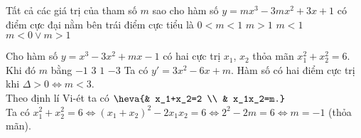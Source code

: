 \begin{ex}%
    Tất cả các giá trị của tham số $m$ sao cho hàm số  $y =  m x^3 - 3 m x^2 +  3 x + 1$  có điểm cực đại nằm bên trái điểm cực tiểu là
    \choice
    {$0 < m < 1$}
    {\True $m > 1$}
    {$  m <1$}
    {$m < 0 \vee m>1 $}
\end{ex}
\begin{ex}%
    Cho hàm số $y=x^3-3x^2+m x-1$ có hai cực trị $x_1$, $x_2$ thỏa mãn $x_1^2+x_2^2=6$. Khi đó $m$ bằng
    \choice
    {\True $-1$}
    {$3$}
    {$1$}
    {$-3$}
    \loigiai
    {
        Ta có $y'=3x^2-6x+m$. Hàm số có hai điểm cực trị khi $\Delta>0\Leftrightarrow m<3$.\\
        Theo định lí Vi-ét ta có $\heva{& x_1+x_2=2 \\ & x_1x_2=m.}$\\
        Ta có $x_1^2+x_2^2=6\Leftrightarrow (x_1+x_2)^2-2x_1x_2=6\Leftrightarrow 2^2-2m=6\Leftrightarrow m=-1$ (thỏa mãn).
    }
\end{ex}
